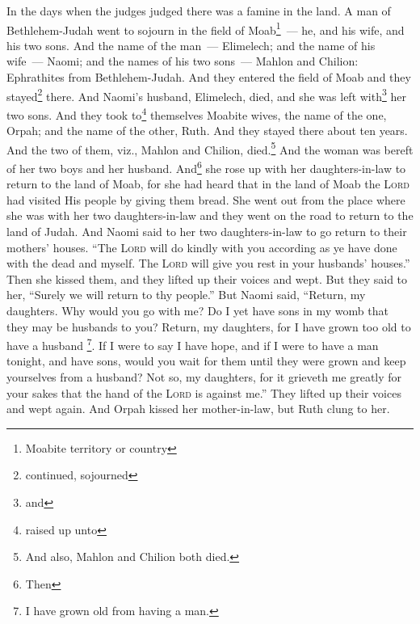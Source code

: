 

\begin{enumerate*}[mode=unboxed]
     In the days when the judges judged there was a famine in the land. A man of Bethlehem-Judah went to sojourn in the field of Moab\footnote{Moabite territory or country}~--- he, and his wife, and his two sons.%
     And the name of the man~--- Elimelech; and the name of his wife~--- Naomi; and the names of his two sons~--- Mahlon and Chilion: Ephrathites from Bethlehem-Judah. And they entered the field of Moab and they stayed\footnote{continued, sojourned} there.%
     And Naomi's husband, Elimelech, died, and she was left with\footnote{and} her two sons.%
     And they took to\footnote{raised up unto} themselves Moabite wives, the name of the one, Orpah; and the name of the other, Ruth. And they stayed there about ten years.%
     And the two of them, viz., Mahlon and Chilion, died.\footnote{ And also, Mahlon and Chilion both died.} And the woman was bereft of her two boys and her husband.%
     And\footnote{Then} she rose up with her daughters-in-law to return to the land of Moab, for she had heard that in the land of Moab the \textsc{Lord} had visited His people by giving them bread.%
     She went out from the place where she was with her two daughters-in-law and they went on the road to return to the land of Judah.%
     And Naomi said to her two daughters-in-law to go return to their mothers' houses. ``The \textsc{Lord} will do kindly with you according as ye have done with the dead and myself.%
     The \textsc{Lord} will give you rest in your husbands' houses.'' Then she kissed them, and they lifted up their voices and wept.%
     But they said to her, ``Surely we will return to thy people.''%
     But Naomi said, ``Return, my daughters. Why would you go with me? Do I yet have sons in my womb that they may be husbands to you?%
     Return, my daughters, for I have grown too old to have a husband \footnote{I have grown old from having a man.}. If I were to say I have hope, and if I were to have a man tonight, and have sons,%
     would you wait for them until they were grown and keep yourselves from a husband? Not so, my daughters, for it grieveth me greatly for your sakes that the hand of the \textsc{Lord} is against me.''%
     They lifted up their voices and wept again. And Orpah kissed her mother-in-law, but Ruth clung to her.%

\end{enumerate*}
